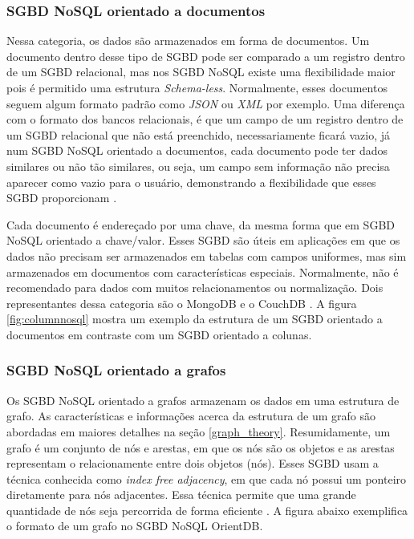 \subsubsection{SGBD NoSQL orientado a documentos}
	Nessa categoria, os dados são armazenados em forma de documentos. Um documento dentro desse tipo de SGBD pode ser comparado a um registro dentro de um SGBD relacional, mas nos SGBD NoSQL existe uma flexibilidade maior pois é permitido uma estrutura \textit{Schema-less}. Normalmente, esses documentos seguem algum formato padrão como \textit{JSON} ou \textit{XML} por exemplo. Uma diferença com o formato dos bancos relacionais, é que um campo de um registro dentro de um SGBD relacional que não está preenchido, necessariamente ficará vazio, já num SGBD NoSQL orientado a documentos, cada documento pode ter dados similares ou não tão similares, ou seja, um campo sem informação não precisa aparecer como vazio para o usuário, demonstrando a flexibilidade que esses SGBD proporcionam \cite{nayak2013type}.
	
	Cada documento é endereçado por uma chave, da mesma forma que em SGBD NoSQL orientado a chave/valor. Esses SGBD são úteis em aplicações em que os dados não precisam ser armazenados em tabelas com campos uniformes, mas sim armazenados em documentos com características especiais. Normalmente, não é recomendado para dados com muitos relacionamentos ou normalização. Dois representantes dessa categoria são o MongoDB e o CouchDB \cite{nayak2013type}. A figura \ref{fig:columnnosql} mostra um exemplo da estrutura de um SGBD orientado a documentos em contraste com um SGBD orientado a colunas.
	
\subsubsection{SGBD NoSQL orientado a grafos}
	Os SGBD NoSQL orientado a grafos armazenam os dados em uma estrutura de grafo. As características e informações acerca da estrutura de um grafo são abordadas em maiores detalhes na seção \ref{graph_theory}. Resumidamente, um grafo é um conjunto de nós e arestas, em que os nós são os objetos e as arestas representam o relacionamente entre dois objetos (nós). Esses SGBD usam a técnica conhecida como  \textit{index free adjacency}, em que cada nó possui um ponteiro diretamente para nós adjacentes. Essa técnica permite que uma grande quantidade de nós seja percorrida de forma eficiente \cite{nayak2013type}. A figura abaixo exemplifica o formato de um grafo no SGBD NoSQL OrientDB.

